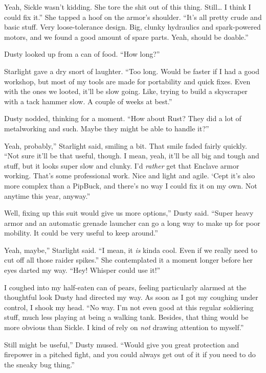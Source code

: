 \leavevmode{}Yeah, Sickle wasn’t kidding. She tore the shit out of this thing. Still… I think I could fix it.” She tapped a hoof on the armor’s shoulder. “It’s all pretty crude and basic stuff. Very loose-tolerance design. Big, clunky hydraulics and spark-powered motors, and we found a good amount of spare parts. Yeah, should be doable.”

Dusty looked up from a can of food. “How long?”

Starlight gave a dry snort of laughter. “Too long. Would be faster if I had a good workshop, but most of my tools are made for portability and quick fixes. Even with the ones we looted, it’ll be slow going. Like, trying to build a skyscraper with a tack hammer slow. A couple of weeks at best.”

Dusty nodded, thinking for a moment. “How about Rust? They did a lot of metalworking and such. Maybe they might be able to handle it?”

\leavevmode{}Yeah, probably,” Starlight said, smiling a bit. That smile faded fairly quickly. “Not sure it’ll be that useful, though. I mean, yeah, it’ll be all big and tough and stuff, but it looks super slow and clunky. I’d \textit{rather} get that Enclave armor working. That’s some professional work. Nice and light and agile. ‘Cept it’s also more complex than a PipBuck, and there’s no way I could fix it on my own. Not anytime this year, anyway.”

\leavevmode{}Well, fixing up this suit would give us more options,” Dusty said. “Super heavy armor and an automatic grenade launcher can go a long way to make up for poor mobility. It could be very useful to keep around.”

\leavevmode{}Yeah, maybe,” Starlight said. “I mean, it \textit{is} kinda cool. Even if we really need to cut off all those raider spikes.” She contemplated it a moment longer before her eyes darted my way. “Hey! Whisper could use it!”

I coughed into my half-eaten can of pears, feeling particularly alarmed at the thoughtful look Dusty had directed my way. As soon as I got my coughing under control, I shook my head. “No way. I’m not even good at this regular soldiering stuff, much less playing at being a walking tank. Besides, that thing would be more obvious than Sickle. I kind of rely on \textit{not} drawing attention to myself.”

\leavevmode{}Still might be useful,” Dusty mused. “Would give you great protection and firepower in a pitched fight, and you could always get out of it if you need to do the sneaky bug thing.”

